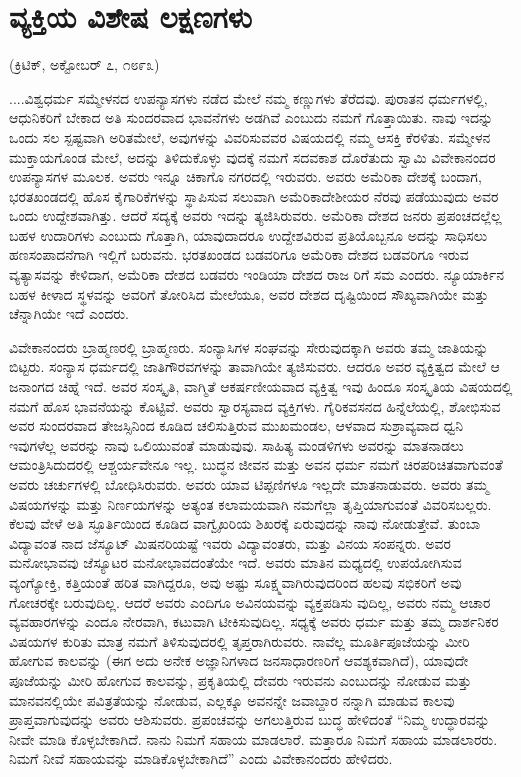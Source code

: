 \delimiter


\section{ವ್ಯಕ್ತಿಯ ವಿಶೇಷ ಲಕ್ಷಣಗಳು}

\begin{center}
(ಕ್ರಿಟಿಕ್​, ಅಕ್ಟೋಬರ್​ ೭, ೧೮೯೩)
\end{center}

....ವಿಶ್ವಧರ್ಮ ಸಮ್ಮೇಳನದ ಉಪನ್ಯಾಸಗಳು ನಡೆದ ಮೇಲೆ ನಮ್ಮ ಕಣ್ಣುಗಳು ತೆರೆದವು. ಪುರಾತನ ಧರ್ಮಗಳಲ್ಲಿ, ಆಧುನಿಕರಿಗೆ ಬೇಕಾದ ಅತಿ ಸುಂದರವಾದ ಭಾವನೆಗಳು ಅಡಗಿವೆ ಎಂಬುದು ನಮಗೆ ಗೊತ್ತಾಯಿತು. ನಾವು ಇದನ್ನು ಒಂದು ಸಲ ಸ್ಪಷ್ಟವಾಗಿ ಅರಿತಮೇಲೆ, ಅವುಗಳನ್ನು ವಿವರಿಸುವವರ ವಿಷಯದಲ್ಲಿ ನಮ್ಮ ಆಸಕ್ತಿ ಕೆರಳಿತು. ಸಮ್ಮೇಳನ ಮುಕ್ತಾಯಗೊಂಡ ಮೇಲೆ, ಅದನ್ನು ತಿಳಿದುಕೊಳ್ಳು ವುದಕ್ಕೆ ನಮಗೆ ಸದವಕಾಶ ದೊರೆತುದು ಸ್ವಾಮಿ ವಿವೇಕಾನಂದರ ಉಪನ್ಯಾಸಗಳ ಮೂಲಕ. ಅವರು ಇನ್ನೂ ಚಿಕಾಗೊ ನಗರದಲ್ಲಿ ಇರುವರು. ಅವರು ಅಮೆರಿಕಾ ದೇಶಕ್ಕೆ ಬಂದಾಗ, ಭರತಖಂಡದಲ್ಲಿ ಹೊಸ ಕೈಗಾರಿಕೆಗಳನ್ನು ಸ್ಥಾಪಿಸುವ ಸಲುವಾಗಿ ಅಮೆರಿಕಾದೇಶೀಯರ ನೆರವು ಪಡೆಯುವುದು ಅವರ ಒಂದು ಉದ್ದೇಶವಾಗಿತ್ತು. ಆದರೆ ಸದ್ಯಕ್ಕೆ ಅವರು ಇದನ್ನು ತ್ಯಜಿಸಿರುವರು. ಅಮೆರಿಕಾ ದೇಶದ ಜನರು ಪ್ರಪಂಚದಲ್ಲೆಲ್ಲ ಬಹಳ ಉದಾರಿಗಳು ಎಂಬುದು ಗೊತ್ತಾಗಿ, ಯಾವುದಾದರೂ ಉದ್ದೇಶವಿರುವ ಪ್ರತಿಯೊಬ್ಬನೂ ಅದನ್ನು ಸಾಧಿಸಲು ಹಣಸಂಪಾದನೆಗಾಗಿ ಇಲ್ಲಿಗೆ ಬರುವನು. ಭರತಖಂಡದ ಬಡವರಿಗೂ ಅಮೆರಿಕಾ ದೇಶದ ಬಡವರಿಗೂ ಇರುವ ವ್ಯತ್ಯಾಸವನ್ನು ಕೇಳಿದಾಗ, ಅಮೆರಿಕಾ ದೇಶದ ಬಡವರು ಇಂಡಿಯಾ ದೇಶದ ರಾಜ ರಿಗೆ ಸಮ ಎಂದರು. ನ್ಯೂಯಾರ್ಕಿನ ಬಹಳ ಕೀಳಾದ ಸ್ಥಳವನ್ನು ಅವರಿಗೆ ತೋರಿಸಿದ ಮೇಲೆಯೂ, ಅವರ ದೇಶದ ದೃಷ್ಟಿಯಿಂದ ಸೌಖ್ಯವಾಗಿಯೇ ಮತ್ತು ಚೆನ್ನಾಗಿಯೇ ಇದೆ ಎಂದರು.

ವಿವೇಕಾನಂದರು ಬ್ರಾಹ್ಮಣರಲ್ಲಿ ಬ್ರಾಹ್ಮಣರು. ಸಂನ್ಯಾಸಿಗಳ ಸಂಘವನ್ನು ಸೇರುವುದಕ್ಕಾಗಿ ಅವರು ತಮ್ಮ ಜಾತಿಯನ್ನು ಬಿಟ್ಟರು. ಸಂನ್ಯಾಸ ಧರ್ಮದಲ್ಲಿ ಜಾತಿಗೌರವಗಳನ್ನು ತಾವಾಗಿಯೇ ತ್ಯಜಿಸುವರು. ಆದರೂ ಅವರ ವ್ಯಕ್ತಿತ್ವದ ಮೇಲೆ ಆ ಜನಾಂಗದ ಚಿಹ್ನೆ ಇದೆ. ಅವರ ಸಂಸ್ಕೃತಿ, ವಾಗ್ಮಿತೆ ಆಕರ್ಷಣೀಯವಾದ ವ್ಯಕ್ತಿತ್ವ ಇವು ಹಿಂದೂ ಸಂಸ್ಕೃತಿಯ ವಿಷಯದಲ್ಲಿ ನಮಗೆ ಹೊಸ ಭಾವನೆಯನ್ನು ಕೊಟ್ಟಿವೆ. ಅವರು ಸ್ವಾರಸ್ಯವಾದ ವ್ಯಕ್ತಿಗಳು. ಗೈರಿಕವಸನದ ಹಿನ್ನೆಲೆಯಲ್ಲಿ, ಶೋಭಿಸುವ ಅವರ ಸುಂದರವಾದ ತೇಜಸ್ಸಿನಿಂದ ಕೂಡಿದ ಚಲಿಸುತ್ತಿರುವ ಮುಖಮಂಡಲ, ಆಳವಾದ ಸುಶ್ರಾವ್ಯವಾದ ಧ್ವನಿ ಇವುಗಳೆಲ್ಲ ಅವರನ್ನು ನಾವು ಒಲಿಯುವಂತೆ ಮಾಡುವುವು. ಸಾಹಿತ್ಯ ಮಂಡಳಿಗಳು ಅವರನ್ನು ಮಾತನಾಡಲು ಆಮಂತ್ರಿಸಿದುದರಲ್ಲಿ ಆಶ್ಚರ್ಯವೇನೂ ಇಲ್ಲ. ಬುದ್ಧನ ಜೀವನ ಮತ್ತು ಅವನ ಧರ್ಮ ನಮಗೆ ಚಿರಪರಿಚಿತವಾಗುವಂತೆ ಅವರು ಚರ್ಚುಗಳಲ್ಲಿ ಬೋಧಿಸಿರುವರು. ಅವರು ಯಾವ ಟಿಪ್ಪಣಿಗಳೂ ಇಲ್ಲದೇ ಮಾತನಾಡುವರು. ಅವರು ತಮ್ಮ ವಿಷಯಗಳನ್ನು ಮತ್ತು ನಿರ್ಣಯಗಳನ್ನು ಅತ್ಯಂತ ಕಲಾಮಯವಾಗಿ ನಮಗೆಲ್ಲಾ ತೃಪ್ತಿಯಾಗುವಂತೆ ವಿವರಿಸಬಲ್ಲರು. ಕೆಲವು ವೇಳೆ ಅತಿ ಸ್ಫೂರ್ತಿಯಿಂದ ಕೂಡಿದ ವಾಗ್ವೈಖರಿಯ ಶಿಖರಕ್ಕೆ ಏರುವುದನ್ನು ನಾವು ನೋಡುತ್ತೇವೆ. ತುಂಬಾ ವಿದ್ಯಾವಂತ ನಾದ ಜೆಸ್ಯೂಟ್​ ಮಿಷನರಿಯಷ್ಟೆ ಇವರು ವಿದ್ಯಾವಂತರು, ಮತ್ತು ವಿನಯ ಸಂಪನ್ನರು. ಅವರ ಮನೋಭಾವವು ಜೆಸ್ಯೂಟರ ಮನೋಭಾವದಂತೆಯೇ ಇದೆ. ಅವರು ಮಾತಿನ ಮಧ್ಯದಲ್ಲಿ ಉಪಯೋಗಿಸುವ ವ್ಯಂಗ್ಯೋಕ್ತಿ, ಕತ್ತಿಯಂತೆ ಹರಿತ ವಾಗಿದ್ದರೂ, ಅವು ಅಷ್ಟು ಸೂಕ್ಷ್ಮವಾಗಿರುವುದರಿಂದ ಹಲವು ಸಭಿಕರಿಗೆ ಅವು ಗೋಚರಕ್ಕೇ ಬರುವುದಿಲ್ಲ. ಆದರೆ ಅವರು ಎಂದಿಗೂ ಅವಿನಯವನ್ನು ವ್ಯಕ್ತಪಡಿಸು ವುದಿಲ್ಲ, ಅವರು ನಮ್ಮ ಆಚಾರ ವ್ಯವಹಾರಗಳನ್ನು ಎಂದೂ ನೇರವಾಗಿ, ಕಟುವಾಗಿ ಟೀಕಿಸುವುದಿಲ್ಲ. ಸಧ್ಯಕ್ಕೆ ಅವರು ಧರ್ಮ ಮತ್ತು ತಮ್ಮ ದಾರ್ಶನಿಕರ ವಿಷಯಗಳ ಕುರಿತು ಮಾತ್ರ ನಮಗೆ ತಿಳಿಸುವುದರಲ್ಲಿ ತೃಪ್ತರಾಗಿರುವರು. ನಾವೆಲ್ಲ ಮೂರ್ತಿಪೂಜೆಯನ್ನು ಮೀರಿ ಹೋಗುವ ಕಾಲವನ್ನು (ಈಗ ಅದು ಅನೇಕ ಅಜ್ಞಾನಿಗಳಾದ ಜನಸಾಧಾರಣರಿಗೆ ಆವಶ್ಯಕವಾಗಿದೆ), ಯಾವುದೇ ಪೂಜೆಯನ್ನು ಮೀರಿ ಹೋಗುವ ಕಾಲವನ್ನು, ಪ್ರಕೃತಿಯಲ್ಲಿ ದೇವರು ಇರುವನು ಎಂಬುದನ್ನು ನೋಡುವ ಮತ್ತು ಮಾನವನಲ್ಲಿಯೇ ಪವಿತ್ರತೆಯನ್ನು ನೋಡುವ, ಎಲ್ಲಕ್ಕೂ ಅವನನ್ನೇ ಜವಾಬ್ದಾರ ನನ್ನಾಗಿ ಮಾಡುವ ಕಾಲವು ಪ್ರಾಪ್ತವಾಗುವುದನ್ನು ಅವರು ಆಶಿಸುವರು. ಪ್ರಪಂಚವನ್ನು ಅಗಲುತ್ತಿರುವ ಬುದ್ಧ ಹೇಳಿದಂತೆ “ನಿಮ್ಮ ಉದ್ಧಾರವನ್ನು ನೀವೇ ಮಾಡಿ ಕೊಳ್ಳಬೇಕಾಗಿದೆ. ನಾನು ನಿಮಗೆ ಸಹಾಯ ಮಾಡಲಾರೆ. ಮತ್ತಾರೂ ನಿಮಗೆ ಸಹಾಯ ಮಾಡಲಾರರು. ನಿಮಗೆ ನೀವೆ ಸಹಾಯವನ್ನು ಮಾಡಿಕೊಳ್ಳಬೇಕಾಗಿದೆ” ಎಂದು ವಿವೇಕಾನಂದರು ಹೇಳಿದರು.

